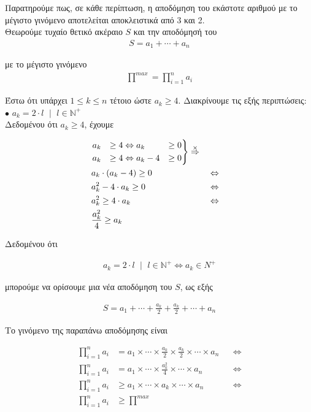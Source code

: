 \documentclass[12pt]{article}
\newcommand{\N}{\mathbb{N}}
\newcommand{\margin}{\hspace{4pt}}
\newcommand{\centered}[1]{\begin{align*}#1\end{align*}}
\newenvironment{rcases}
	{\left.\begin{aligned}}
	{\end{aligned}\right\rbrace}
\begin{document}
Παρατηρούμε πως, σε κάθε περίπτωση, η αποδόμηση του εκάστοτε αριθμού με το μέγιστο γινόμενο αποτελείται αποκλειστικά από 3 και 2. \\

Θεωρούμε τυχαίο θετικό ακέραιο \( S \) και την αποδόμησή του \\

\centered{S = a_1 + \dotsb + a_n}

με το μέγιστο γινόμενο \\

\centered{\stackrel{max}{\prod} = \prod_{i = 1}^{n} a_i}

Έστω ότι υπάρχει \( 1 \leq k \leq n \) τέτοιο ώστε \( a_k \geq 4 \).
Διακρίνουμε τις εξής περιπτώσεις: \\

\( \bullet \) \( a_k = 2 \cdot l \margin \mid \margin l \in \N^+ \) \\

Δεδομένου ότι \( a_k \geq 4 \), έχουμε

\begin{align*}
    &\begin{rcases}
        a_k & & \geq 4 & \Leftrightarrow a_k & \geq 0 \\
        a_k & & \geq 4 & \Leftrightarrow a_k - 4 & \geq 0
    \end{rcases}
    \stackrel{\times}{\Rightarrow} \\
    &a_k \cdot (a_k - 4) \geq 0 && \Leftrightarrow \\
    &a_k^2 - 4 \cdot a_k \geq 0 && \Leftrightarrow \\
    &a_k^2 \geq 4 \cdot a_k && \Leftrightarrow \\
    &\frac{a_k^2}{4} \geq a_k
\end{align*}

Δεδομένου ότι

\centered{a_k = 2 \cdot l \margin \mid \margin l \in \N^+ \Leftrightarrow a_k \in N^+}

μπορούμε να ορίσουμε μια νέα αποδόμηση του \( S \), ως εξής

\centered{S = a_1 + \dotsb + \frac{a_k}{2} + \frac{a_k}{2} + \dotsb + a_n}

Το γινόμενο της παραπάνω αποδόμησης είναι

\begin{align*}
    \prod_{i = 1}^{n} a_i & = a_1 \times \dotsb \times \frac{a_k}{2} \times \frac{a_k}{2} \times \dotsb \times a_n && \Leftrightarrow \\
    \prod_{i = 1}^{n} a_i & = a_1 \times \dotsb \times \frac{a_k^2}{4} \times \dotsb \times a_n && \Leftrightarrow \\
    \prod_{i = 1}^{n} a_i & \geq a_1 \times \dotsb \times a_k \times \dotsb \times a_n && \Leftrightarrow \\
    \prod_{i = 1}^{n} a_i & \geq \stackrel{max}{\prod}
\end{align*}
\end{document}

